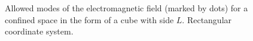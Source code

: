 \begin{figure}
\centering

\caption{Allowed modes of the electromagnetic field (marked by dots) for a confined
  space in the form of a cube with side $L$. Rectangular
  coordinate system.}
\label{figCh1_pic3}
\end{figure}